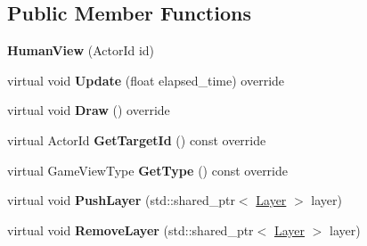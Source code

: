 \subsection*{Public Member Functions}
\begin{DoxyCompactItemize}
\item 
\mbox{\label{classTarbora_1_1HumanView_aa8cb78e48fc80415f510c1c6f602b9ad}} 
{\bfseries Human\+View} (Actor\+Id id)
\item 
\mbox{\label{classTarbora_1_1HumanView_a06d793557524a02d65a6a6b71bfecb14}} 
virtual void {\bfseries Update} (float elapsed\+\_\+time) override
\item 
\mbox{\label{classTarbora_1_1HumanView_a0b7e7db0f511c36bac18c51a7e897731}} 
virtual void {\bfseries Draw} () override
\item 
\mbox{\label{classTarbora_1_1HumanView_ab6b2d5d60456394ec63b26f6d7165999}} 
virtual Actor\+Id {\bfseries Get\+Target\+Id} () const override
\item 
\mbox{\label{classTarbora_1_1HumanView_ab28ff0f3d95224b13bb7244183737d1c}} 
virtual Game\+View\+Type {\bfseries Get\+Type} () const override
\item 
\mbox{\label{classTarbora_1_1HumanView_a4e759e449f1d866a693b9397b9c42c42}} 
virtual void {\bfseries Push\+Layer} (std\+::shared\+\_\+ptr$<$ \hyperlink{classTarbora_1_1Layer}{Layer} $>$ layer)
\item 
\mbox{\label{classTarbora_1_1HumanView_a766f8e93c1e7477f87f300e833deb08d}} 
virtual void {\bfseries Remove\+Layer} (std\+::shared\+\_\+ptr$<$ \hyperlink{classTarbora_1_1Layer}{Layer} $>$ layer)
\end{DoxyCompactItemize}
